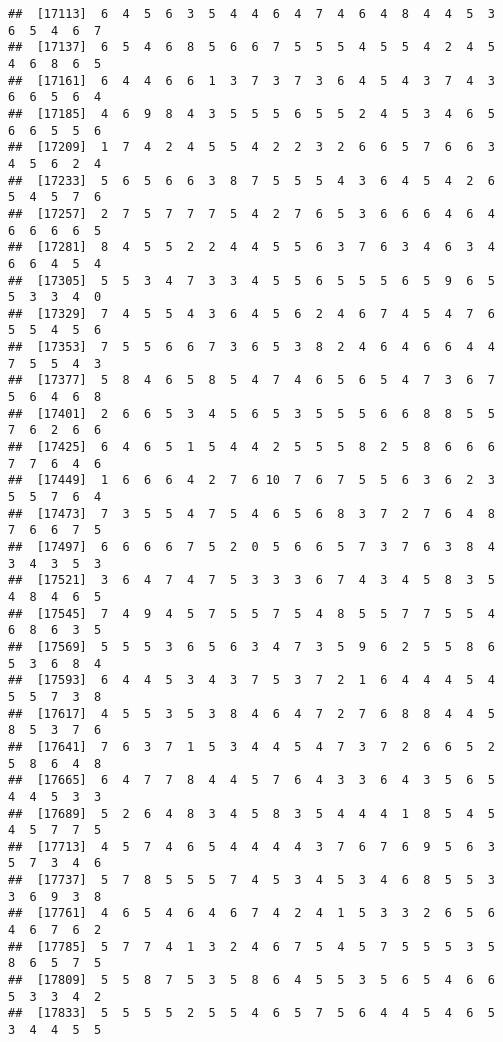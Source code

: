 \documentclass[
]{book}
\begin{document}
\begin{verbatim}
##  [17113]  6  4  5  6  3  5  4  4  6  4  7  4  6  4  8  4  4  5  3  6  5  4  6  7
##  [17137]  6  5  4  6  8  5  6  6  7  5  5  5  4  5  5  4  2  4  5  4  6  8  6  5
##  [17161]  6  4  4  6  6  1  3  7  3  7  3  6  4  5  4  3  7  4  3  6  6  5  6  4
##  [17185]  4  6  9  8  4  3  5  5  5  6  5  5  2  4  5  3  4  6  5  6  6  5  5  6
##  [17209]  1  7  4  2  4  5  5  4  2  2  3  2  6  6  5  7  6  6  3  4  5  6  2  4
##  [17233]  5  6  5  6  6  3  8  7  5  5  5  4  3  6  4  5  4  2  6  5  4  5  7  6
##  [17257]  2  7  5  7  7  7  5  4  2  7  6  5  3  6  6  6  4  6  4  6  6  6  6  5
##  [17281]  8  4  5  5  2  2  4  4  5  5  6  3  7  6  3  4  6  3  4  6  6  4  5  4
##  [17305]  5  5  3  4  7  3  3  4  5  5  6  5  5  5  6  5  9  6  5  5  3  3  4  0
##  [17329]  7  4  5  5  4  3  6  4  5  6  2  4  6  7  4  5  4  7  6  5  5  4  5  6
##  [17353]  7  5  5  6  6  7  3  6  5  3  8  2  4  6  4  6  6  4  4  7  5  5  4  3
##  [17377]  5  8  4  6  5  8  5  4  7  4  6  5  6  5  4  7  3  6  7  5  6  4  6  8
##  [17401]  2  6  6  5  3  4  5  6  5  3  5  5  5  6  6  8  8  5  5  7  6  2  6  6
##  [17425]  6  4  6  5  1  5  4  4  2  5  5  5  8  2  5  8  6  6  6  7  7  6  4  6
##  [17449]  1  6  6  6  4  2  7  6 10  7  6  7  5  5  6  3  6  2  3  5  5  7  6  4
##  [17473]  7  3  5  5  4  7  5  4  6  5  6  8  3  7  2  7  6  4  8  7  6  6  7  5
##  [17497]  6  6  6  6  7  5  2  0  5  6  6  5  7  3  7  6  3  8  4  3  4  3  5  3
##  [17521]  3  6  4  7  4  7  5  3  3  3  6  7  4  3  4  5  8  3  5  4  8  4  6  5
##  [17545]  7  4  9  4  5  7  5  5  7  5  4  8  5  5  7  7  5  5  4  6  8  6  3  5
##  [17569]  5  5  5  3  6  5  6  3  4  7  3  5  9  6  2  5  5  8  6  5  3  6  8  4
##  [17593]  6  4  4  5  3  4  3  7  5  3  7  2  1  6  4  4  4  5  4  5  5  7  3  8
##  [17617]  4  5  5  3  5  3  8  4  6  4  7  2  7  6  8  8  4  4  5  8  5  3  7  6
##  [17641]  7  6  3  7  1  5  3  4  4  5  4  7  3  7  2  6  6  5  2  5  8  6  4  8
##  [17665]  6  4  7  7  8  4  4  5  7  6  4  3  3  6  4  3  5  6  5  4  4  5  3  3
##  [17689]  5  2  6  4  8  3  4  5  8  3  5  4  4  4  1  8  5  4  5  4  5  7  7  5
##  [17713]  4  5  7  4  6  5  4  4  4  4  3  7  6  7  6  9  5  6  3  5  7  3  4  6
##  [17737]  5  7  8  5  5  5  7  4  5  3  4  5  3  4  6  8  5  5  3  3  6  9  3  8
##  [17761]  4  6  5  4  6  4  6  7  4  2  4  1  5  3  3  2  6  5  6  4  6  7  6  2
##  [17785]  5  7  7  4  1  3  2  4  6  7  5  4  5  7  5  5  5  3  5  8  6  5  7  5
##  [17809]  5  5  8  7  5  3  5  8  6  4  5  5  3  5  6  5  4  6  6  5  3  3  4  2
##  [17833]  5  5  5  5  2  5  5  4  6  5  7  5  6  4  4  5  4  6  5  3  4  4  5  5

\end{verbatim}
\end{document}
